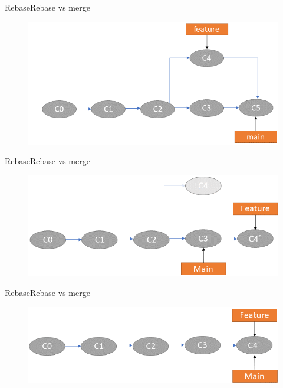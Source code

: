 \begin{frame}{Rebase}{Rebase vs merge}
  \begin{figure}
    \begin{center}
    \includegraphics[width=0.6\linewidth]{pics/rebase-vs-merge-2.png}
    \vspace{-0.3cm}
  \end{center}
\end{figure}
\end{frame}

\begin{frame}{Rebase}{Rebase vs merge}
  \begin{figure}
    \begin{center}
    \includegraphics[width=0.6\linewidth]{pics/rebase-vs-merge-3.png}
    \vspace{-0.3cm}
  \end{center}
\end{figure}
\end{frame}

\begin{frame}{Rebase}{Rebase vs merge}

  \begin{figure}
    \begin{center}
    \includegraphics[width=0.6\linewidth]{pics/rebase-vs-merge-4.png}
  \end{center}
\end{figure}
\end{frame}
